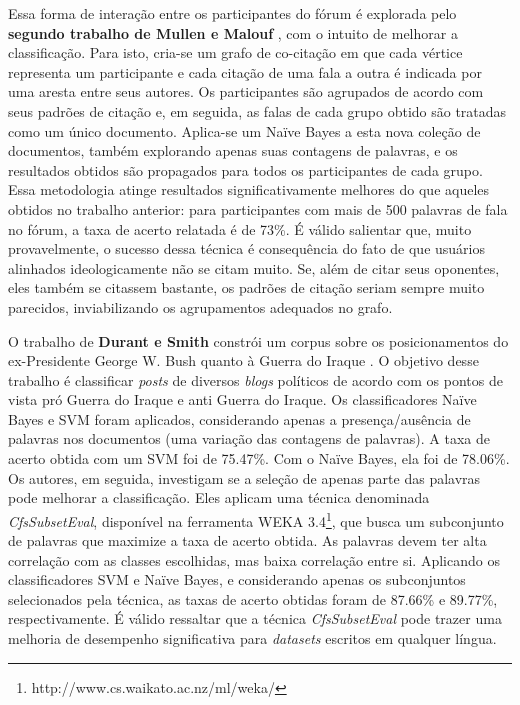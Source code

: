 Essa forma de interação entre os participantes do fórum é explorada pelo \textbf{segundo trabalho de Mullen e Malouf} \cite{malouf-taking_sides}, com o intuito de melhorar a classificação. Para isto, cria-se um grafo de co-citação em que cada vértice representa um participante e cada citação de uma fala a outra é indicada por uma aresta entre seus autores. Os participantes são agrupados de acordo com seus padrões de citação e, em seguida, as falas de cada grupo obtido são tratadas como um único documento. Aplica-se um Naïve Bayes a esta nova coleção de documentos, também explorando apenas suas contagens de palavras, e os resultados obtidos são propagados para todos os participantes de cada grupo. Essa metodologia atinge resultados significativamente melhores do que aqueles obtidos no trabalho anterior: para participantes com mais de 500 palavras de fala no fórum, a taxa de acerto relatada é de 73\%. É válido salientar que, muito provavelmente, o sucesso dessa técnica é consequência do fato de que usuários alinhados ideologicamente não se citam muito. Se, além de citar seus oponentes, eles também se citassem bastante, os padrões de citação seriam sempre muito parecidos, inviabilizando os agrupamentos adequados no grafo.

O trabalho de \textbf{Durant e Smith} constrói um corpus sobre os posicionamentos do ex-Presidente George W. Bush quanto à Guerra do Iraque \cite{durant-smith}. O objetivo desse trabalho é classificar \emph{posts} de diversos \emph{blogs} políticos de acordo com os pontos de vista pró Guerra do Iraque e anti Guerra do Iraque.  Os classificadores Naïve Bayes e SVM foram aplicados, considerando apenas a presença/ausência de palavras nos documentos (uma variação das contagens de palavras). A taxa de acerto obtida com um SVM foi de 75.47\%. Com o Naïve Bayes, ela foi de 78.06\%. Os autores, em seguida, investigam se a seleção de apenas parte das palavras pode melhorar a classificação. Eles aplicam uma técnica denominada \emph{CfsSubsetEval}, disponível na ferramenta WEKA 3.4\footnote{http://www.cs.waikato.ac.nz/ml/weka/}, que busca um subconjunto de palavras que maximize a taxa de acerto obtida. As palavras devem ter alta correlação com as classes escolhidas, mas baixa correlação entre si. Aplicando os classificadores SVM e Naïve Bayes, e considerando apenas os subconjuntos selecionados pela técnica, as taxas de acerto obtidas foram de 87.66\% e 89.77\%, respectivamente. É válido ressaltar que a técnica \emph{CfsSubsetEval} pode trazer uma melhoria de desempenho significativa para \emph{datasets} escritos em qualquer língua.

